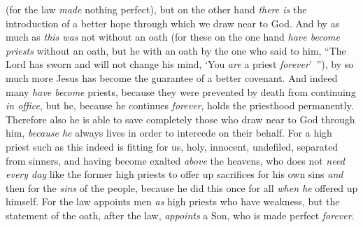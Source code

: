 \begin{biblechapter}
\verse (for the law \textit{made} nothing perfect), but on the other hand \textit{there is} the introduction of a better hope through which we draw near to God.
\verse And by as much as \textit{this was} not without an oath (for these on the one hand \textit{have become priests} without an oath,
\verse but he with an oath by the one who said to him, “The Lord has sworn and will not change his mind, 
‘You \textit{are} a priest \textit{forever}’ ”),
\verse by so much more Jesus has become the guarantee of a better covenant.
\verse And indeed many \textit{have become} priests, because they were prevented by death from continuing \textit{in office},
\verse but he, because he continues \textit{forever}, holds the priesthood permanently.
\verse Therefore also he is able to save completely those who draw near to God through him, \textit{because he} always lives in order to intercede on their behalf.
\verse For a high priest such as this indeed is fitting for us, holy, innocent, undefiled, separated from sinners, and having become exalted \textit{above} the heavens,
\verse who does not \textit{need every day} like the former high priests to offer up sacrifices for his own sins \textit{and} then for the \textit{sins} of the people, because he did this once for all \textit{when he} offered up himself.
\verse For the law appoints men \textit{as} high priests who have weakness, but the statement of the oath, after the law, \textit{appoints} a Son, who is made perfect \textit{forever}.
\end{biblechapter}


